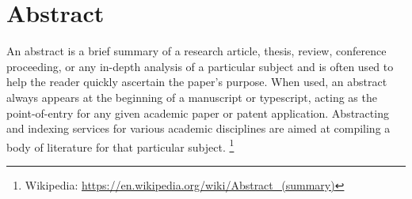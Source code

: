 \chapter*{Abstract}

An abstract is a brief summary of a research article, thesis, review, conference proceeding,
or any in-depth analysis of a particular subject
and is often used to help the reader quickly ascertain the paper's purpose.
When used, an abstract always appears at the beginning of a manuscript or typescript,
acting as the point-of-entry for any given academic paper or patent application.
Abstracting and indexing services for various academic disciplines
are aimed at compiling a body of literature for that particular subject.
\footnote{Wikipedia: \url{https://en.wikipedia.org/wiki/Abstract_(summary)}}

